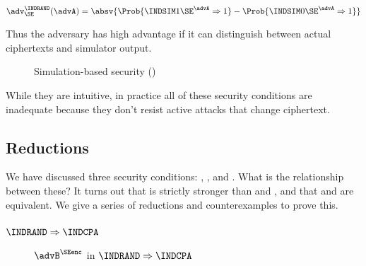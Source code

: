 $$
\adv_{\SE}^{\INDRAND}(\advA) =
\absv{\Prob{\INDSIM1{\SE}^{\advA} \Rightarrow 1} - 
      \Prob{\INDSIM0{\SE}^{\advA} \Rightarrow 1}}
$$

Thus the adversary has high advantage if it can distinguish between
actual ciphertexts and simulator output.

\begin{figure}[p]
	\centering
  \caption{Simulation-based security (\INDSIM)}
	\label{fig:ind-sim}
\end{figure} 

While they are intuitive, in practice all of these security conditions are
inadequate because they don't resist active attacks that change ciphertext.

\subsection{Reductions}
\label{sec:randomenc-reduct}

We have discussed three security conditions: \INDRAND, \INDCPA, and \INDSIM.
What is the relationship between these? It turns out that \INDRAND is
strictly stronger than \INDCPA and \INDSIM, and that \INDCPA and \INDSIM are
equivalent. We give a series of reductions and counterexamples to prove this.

\subsubsection*{$\INDRAND \Rightarrow \INDCPA$}

\begin{figure}[p]
	\centering
  \caption{$\advB^{\SEenc}$ in $\INDRAND \Rightarrow \INDCPA$}
  \label{fig:indcpa-indrand-adv}
\end{figure}

